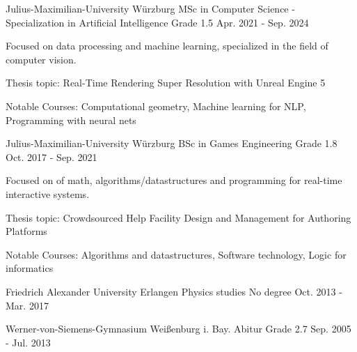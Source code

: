 

\begin{cventries}

  \cventry
    {Julius-Maximilian-University Würzburg} %
    {MSc in Computer Science - Specialization in Artificial Intelligence} %
    {Grade 1.5} %
    {Apr. 2021 - Sep. 2024} %
    {
      \begin{cvitems} %
        \item {Focused on data processing and machine learning, specialized in the field of computer vision.}
        \item {Thesis topic: Real-Time Rendering Super Resolution with Unreal Engine 5}
        \item {Notable Courses: Computational geometry, Machine learning for NLP, Programming with neural nets}
      \end{cvitems}
    }

\cventry
{Julius-Maximilian-University Würzburg} %
{BSc in Games Engineering} %
{Grade 1.8} %
{Oct. 2017 - Sep. 2021} %
{
  \begin{cvitems} %
    \item {Focused on of math, algorithms/datastructures and programming for real-time interactive systems.}
    \item {Thesis topic: Crowdsourced Help Facility Design and Management for Authoring Platforms}
    \item {Notable Courses: Algorithms and datastructures, Software technology, Logic for informatics}
  \end{cvitems}
}

\cventry
{Friedrich Alexander University Erlangen} %
{Physics studies} %
{No degree} %
{Oct. 2013 - Mar. 2017} %
{}

\cventry
{Werner-von-Siemens-Gymnasium Weißenburg i. Bay.} %
{Abitur} %
{Grade 2.7} %
{Sep. 2005 - Jul. 2013} %
{}

\end{cventries}
